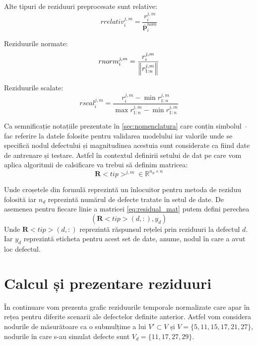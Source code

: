 Alte tipuri de reziduuri preprocesate sunt relative:
\begin{equation}
rrelativ_i^{j,m} = \frac{r_i^{j,m}}{\overline{\mathbf{p}}_i^{nom}} 
\label{eq:relative_residual}
\end{equation}

Reziduurile normate:
\begin{equation}
rnorm_{i}^{j,m} =  \frac{r_i^{j,m}}{ \left\lVert r_{1:n}^{j,m}\right\rVert} 
\label{eq:norm_residual}
\end{equation}

Reziduurile scalate:
\begin{equation}
rscal_{i}^{j,m} = \frac{r_i^{j,m} - \min r_{1:n}^{j,m}}{ \max r_{1:n}^{j,m} -  \min r_{1:n}^{j,m}}
\label{eq:scaled_residual}
\end{equation}


Ca semnificație notațiile prezentate în \ref{sec:nomenclatura} care conțin simbolul~ $\widehat{}$~ fac referire la datele folosite pentru validarea modelului iar valorile unde se specifică nodul defectului și magnitudinea acestuia sunt considerate ca fiind date de antrenare și testare. Astfel în contextul definirii setului de dat pe care vom aplica algoritmii de calsificare va trebui să definim matricea:
\begin{equation}
\mathbf{R}<tip>^{j, m} \in \mathbb{R}^{n_{d} \times n}
\label{eq:residual_mat}
\end{equation}

Unde croșetele din formulă reprezintă un înlocuitor pentru metoda de reziduu folosită iar $n_{d}$ reprezintă numărul de defecte tratate în setul de date. De asemenea pentru fiecare linie a matricei \eqref{eq:residual_mat} putem defini perechea
\begin{equation}
\left( \mathbf{R}<tip>(d,:), y_{d} \right)
\label{eq:residual_mat_label}
\end{equation} 
Unde $ \mathbf{R}<tip>(d,:)$ reprezintă răspunsul rețelei prin reziduuri la defectul $d$. Iar $y_{d}$ reprezintă eticheta pentru acest set de date, anume, nodul în care a avut loc defectul.

\section{Calcul și prezentare reziduuri}
În continuare vom prezenta grafic reziduurile temporale normalizate care apar în rețea pentru diferite scenarii ale defectelor definite anterior.
Astfel vom considera nodurile de măsurătoare ca o submulțime  a lui $V' \subset V$ și $ V = \{5, 11, 15, 17, 21, 27\}$, nodurile în care s-au simulat defecte sunt $V_{d} = \{11, 17, 27,29\}$.

